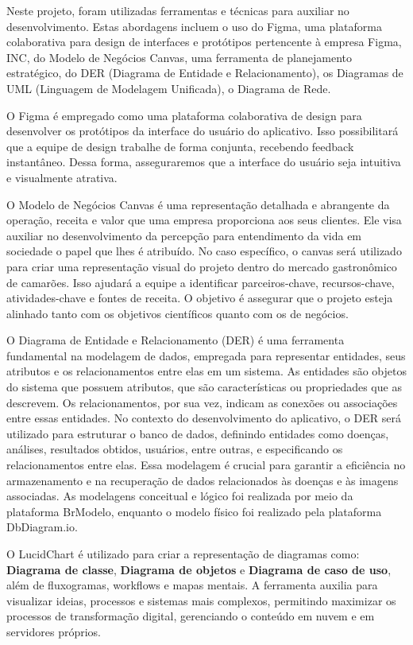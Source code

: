 Neste projeto, foram utilizadas ferramentas e técnicas para auxiliar no desenvolvimento. Estas abordagens incluem o uso do Figma, uma plataforma colaborativa para design de interfaces e protótipos pertencente à empresa Figma, INC, do Modelo de Negócios Canvas, uma ferramenta de planejamento estratégico, do DER (Diagrama de Entidade e Relacionamento), os Diagramas de UML (Linguagem de Modelagem Unificada), o Diagrama de Rede.

O Figma é empregado como uma plataforma colaborativa de design para desenvolver os protótipos da interface do usuário do aplicativo. Isso possibilitará que a equipe de design trabalhe de forma conjunta, recebendo feedback instantâneo. Dessa forma, asseguraremos que a interface do usuário seja intuitiva e visualmente atrativa\cite{lopes2023}. 

O Modelo de Negócios Canvas é uma representação detalhada e abrangente da operação, receita e valor que uma empresa proporciona aos seus clientes. Ele visa auxiliar no desenvolvimento da percepção para entendimento da vida em sociedade o papel que lhes é atribuído. No caso específico, o canvas será utilizado para criar uma representação visual do projeto dentro do mercado gastronômico de camarões. Isso ajudará a equipe a identificar parceiros-chave, recursos-chave, atividades-chave e fontes de receita. O objetivo é assegurar que o projeto esteja alinhado tanto com os objetivos científicos quanto com os de negócios\cite{biava2017}. 

O Diagrama de Entidade e Relacionamento (DER) é uma ferramenta fundamental na modelagem de dados, empregada para representar entidades, seus atributos e os relacionamentos entre elas em um sistema. As entidades são objetos do sistema que possuem atributos, que são características ou propriedades que as descrevem. Os relacionamentos, por sua vez, indicam as conexões ou associações entre essas entidades. No contexto do desenvolvimento do aplicativo, o DER será utilizado para estruturar o banco de dados, definindo entidades como doenças, análises, resultados obtidos, usuários, entre outras, e especificando os relacionamentos entre elas. Essa modelagem é crucial para garantir a eficiência no armazenamento e na recuperação de dados relacionados às doenças e às imagens associadas\cite{awari2023}. As modelagens conceitual e lógico foi realizada por meio da plataforma BrModelo, enquanto o modelo físico foi realizado pela plataforma DbDiagram.io.

O LucidChart é utilizado para criar a representação de diagramas como:  \textbf{Diagrama de classe}, \textbf{Diagrama de objetos} e \textbf{Diagrama de caso de uso}, além de fluxogramas, workflows e mapas mentais. A ferramenta auxilia para visualizar ideias, processos e sistemas mais complexos, permitindo maximizar os processos de transformação digital, gerenciando o conteúdo em nuvem e em servidores próprios. 


